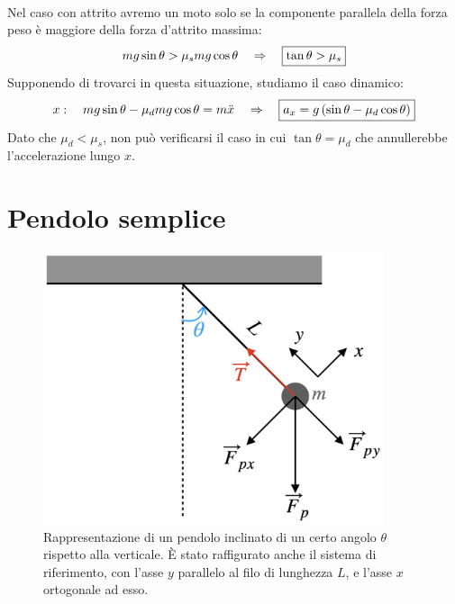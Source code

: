 \\
Nel caso con attrito avremo un moto solo se la componente parallela della
forza peso è maggiore della forza d'attrito massima:
\begin{equation}
    mg\sin\theta > \mu_s mg\cos\theta\quad\Rightarrow\quad \boxed{\tan\theta>\mu_s}
\end{equation}
Supponendo di trovarci in questa situazione, studiamo il caso dinamico:
\begin{equation}
    x:\quad mg\sin\theta -\mu_d mg\cos\theta = m\ddot x\quad\Rightarrow\quad
    \boxed{a_x = g\left(\sin\theta-\mu_d\cos\theta\right)}
\end{equation}
Dato che $\mu_d<\mu_s$, non può verificarsi il caso in cui $\tan\theta
=\mu_d$ che annullerebbe l'accelerazione lungo $x$.

\section{Pendolo semplice}
\begin{figure}[htbp]
    \begin{center}
        \includegraphics[width=10cm]{images/pendolo.png}
        \caption{Rappresentazione di un pendolo inclinato di un certo angolo
        $\theta$ rispetto alla verticale. È stato raffigurato anche il sistema
        di riferimento, con l'asse $y$ parallelo al filo di lunghezza $L$, e
        l'asse $x$ ortogonale ad esso.}
\end{center}
\label{fig:Iplain&pendulum:pendulum}
\end{figure}

